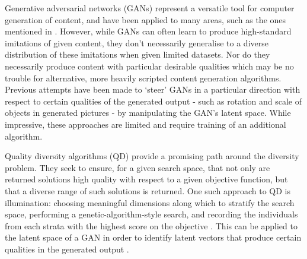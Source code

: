 \documentclass{article}
\begin{document}




Generative adversarial networks (GANs) \cite{Goodfellow2014} represent a versatile tool for computer generation of content, and have been applied to many areas, such as the ones mentioned in \cite{Banjo2020,Antipoy2017,Paganini2018,Lan2020}. However, while GANs can often learn to produce high-standard imitations of given content, they don't necessarily generalise to a diverse distribution of these imitations when given limited datasets. Nor do they necessarily produce content with particular desirable qualities which may be no trouble for alternative, more heavily scripted content generation algorithms. Previous attempts have been made to `steer' GANs in a particular direction with respect to certain qualities of the generated output - such as rotation and scale of objects in generated pictures \cite{Jahanian2019} - by manipulating the GAN's latent space. While impressive, these approaches are limited and require training of an additional algorithm.

Quality diversity algorithms (QD) provide a promising path around the diversity problem. They seek to ensure, for a given search space, that not only are returned solutions high quality with respect to a given objective function, but that a diverse range of such solutions is returned. One such approach to QD is illumination: choosing meaningful dimensions along which to stratify the search space, performing a genetic-algorithm-style search, and recording the individuals from each strata with the highest score on the objective \cite{Mouret2015}. This can be applied to the latent space of a GAN in order to identify latent vectors that produce certain qualities in the generated output \cite{Fontaine2020}.
\end{document}
